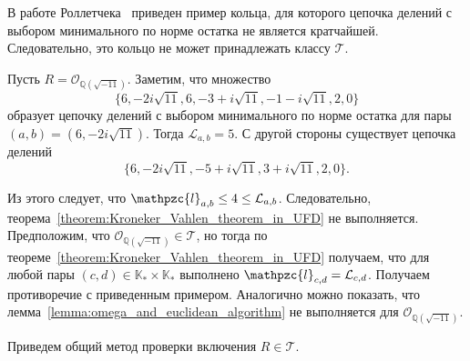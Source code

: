 \documentclass[_00_dissertation.tex]{subfiles}
\begin{document}
В работе Роллетчека~\cite[с.~341]{source:Rolletschek_1990} приведен пример кольца, для которого цепочка делений с выбором минимального по норме остатка не является кратчайшей.
Следовательно, это кольцо не может принадлежать классу $\mathcal{T}$.

\begin{example}\label{example:Z[sqrt{-11}]} \cite[с.~341]{source:Rolletschek_1990}
    Пусть $R = \mathcal{O}_{\mathbb{Q}(\sqrt{-11})}$.
    Заметим, что множество
    \begin{equation*}
        \{6,-2i\sqrt{11},6,-3+i\sqrt{11},-1-i\sqrt{11},2,0\}
    \end{equation*}
    образует цепочку делений с выбором минимального по норме остатка для пары $(a,b)=(6,-2i\sqrt{11})$.
    Тогда $\mathcal{L}_{a,b}=5$.
    С другой стороны существует цепочка делений
    \begin{equation*}
        \{6,-2i\sqrt{11},-5+i\sqrt{11},3+i\sqrt{11},2,0\}.
    \end{equation*}
    
    Из этого следует, что $\mathpzc{l}_{a,b}\le 4\le \mathcal{L}_{a,b}$.
    Следовательно, теорема~\ref{theorem:Kroneker_Vahlen_theorem_in_UFD} не выполняется.
    Предположим, что $\mathcal{O}_{\mathbb{Q}(\sqrt{-11})} \in \mathcal{T}$, но тогда по теореме~\ref{theorem:Kroneker_Vahlen_theorem_in_UFD} получаем, что для любой пары $(c,d)\in\mathbb{K}_* \times\mathbb{K}_*$ выполнено $\mathpzc{l}_{c,d}=\mathcal{L}_{c,d}$.
    Получаем противоречие с приведенным примером.
    Аналогично можно показать, что лемма~\ref{lemma:omega_and_euclidean_algorithm} не выполняется для $\mathcal{O}_{\mathbb{Q}(\sqrt{-11})}$.
\end{example}


Приведем общий метод проверки включения $R \in \mathcal{T}$.
\end{document}
